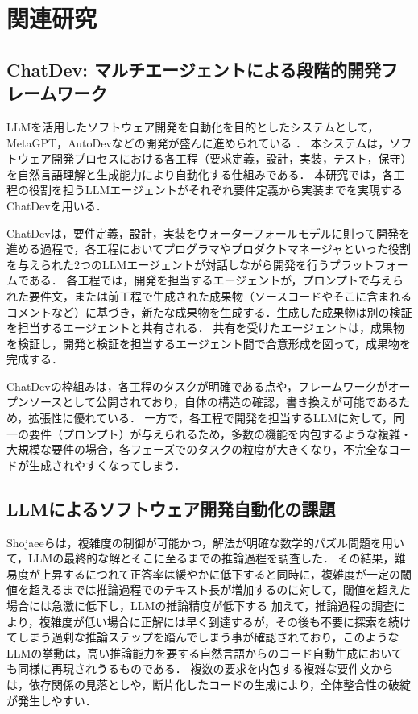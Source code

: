 \documentclass[submit,techrep,noauthor]{ipsj}
\begin{document}
\section{関連研究}
\label{sec:related}

\subsection{ChatDev: マルチエージェントによる段階的開発フレームワーク}
LLMを活用したソフトウェア開発を自動化を目的としたシステムとして，MetaGPT，AutoDevなどの開発が盛んに進められている\cite{metagpt} \cite{autodev}．
本システムは，ソフトウェア開発プロセスにおける各工程（要求定義，設計，実装，テスト，保守）を自然言語理解と生成能力により自動化する仕組みである．
本研究では，各工程の役割を担うLLMエージェントがそれぞれ要件定義から実装までを実現するChatDev\cite{qian-etal-2024-chatdev}を用いる．

ChatDevは，要件定義，設計，実装をウォーターフォールモデルに則って開発を進める過程で，各工程においてプログラマやプロダクトマネージャといった役割を与えられた2つのLLMエージェントが対話しながら開発を行うプラットフォームである．
各工程では，開発を担当するエージェントが，プロンプトで与えられた要件文，または前工程で生成された成果物（ソースコードやそこに含まれるコメントなど）に基づき，新たな成果物を生成する．生成した成果物は別の検証を担当するエージェントと共有される．
共有を受けたエージェントは，成果物を検証し，開発と検証を担当するエージェント間で合意形成を図って，成果物を完成する．

ChatDevの枠組みは，各工程のタスクが明確である点や，フレームワークがオープンソースとして公開されており，自体の構造の確認，書き換えが可能であるため，拡張性に優れている．
一方で，各工程で開発を担当するLLMに対して，同一の要件（プロンプト）が与えられるため，多数の機能を内包するような複雑・大規模な要件の場合，各フェーズでのタスクの粒度が大きくなり，不完全なコードが生成されやすくなってしまう．


\subsection{LLMによるソフトウェア開発自動化の課題}
Shojaeeら\cite{IllusionApple}は，複雑度の制御が可能かつ，解法が明確な数学的パズル問題を用いて，LLMの最終的な解とそこに至るまでの推論過程を調査した．
その結果，難易度が上昇するにつれて正答率は緩やかに低下すると同時に，複雑度が一定の閾値を超えるまでは推論過程でのテキスト長が増加するのに対して，閾値を超えた場合には急激に低下し，LLMの推論精度が低下する
加えて，推論過程の調査により，複雑度が低い場合に正解には早く到達するが，その後も不要に探索を続けてしまう過剰な推論ステップを踏んでしまう事が確認されており，このようなLLMの挙動は，高い推論能力を要する自然言語からのコード自動生成においても同様に再現されうるものである．
複数の要求を内包する複雑な要件文からは，依存関係の見落としや，断片化したコードの生成により，全体整合性の破綻が発生しやすい．
\end{document}

